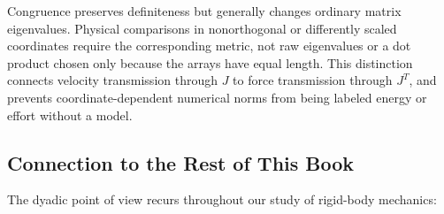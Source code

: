 Congruence preserves definiteness but generally changes ordinary matrix eigenvalues. Physical comparisons in nonorthogonal or differently scaled coordinates require the corresponding metric, not raw eigenvalues or a dot product chosen only because the arrays have equal length. This distinction connects velocity transmission through $J$ to force transmission through $J^T$, and prevents coordinate-dependent numerical norms from being labeled energy or effort without a model.

\subsection{Connection to the Rest of This Book}
\label{subsec:dyadic-connections}

The dyadic point of view recurs throughout our study of rigid-body
mechanics:

